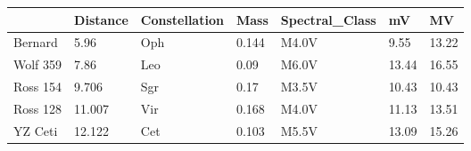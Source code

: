\begin{tabular}{lllllll}
\toprule
{} & Distance & Constellation &   Mass & Spectral\_Class &     mV &     MV \\
\midrule
Bernard  &     5.96 &           Oph &  0.144 &          M4.0V &   9.55 &  13.22 \\
Wolf 359 &     7.86 &           Leo &   0.09 &          M6.0V &  13.44 &  16.55 \\
Ross 154 &    9.706 &           Sgr &   0.17 &          M3.5V &  10.43 &  10.43 \\
Ross 128 &   11.007 &           Vir &  0.168 &          M4.0V &  11.13 &  13.51 \\
YZ Ceti  &   12.122 &           Cet &  0.103 &          M5.5V &  13.09 &  15.26 \\
\bottomrule
\end{tabular}
